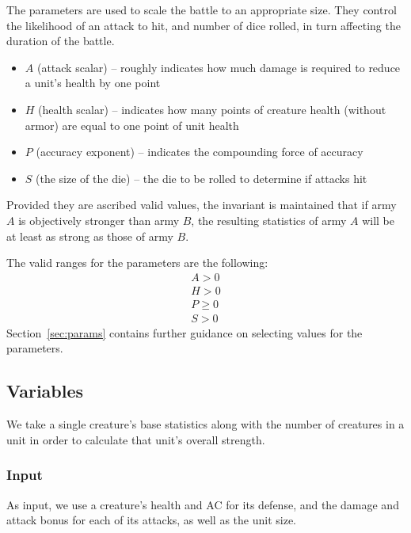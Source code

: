 \documentclass[twocolumn]{article}
\begin{document}
The parameters are used to scale the battle to an appropriate size.
They control the likelihood of an attack to hit,
and number of dice rolled,
in turn affecting the duration of the battle.

\begin{itemize}
    \item $A$ (attack scalar) -- roughly indicates how much damage is required to reduce a unit's health by one point
    \item $H$ (health scalar) -- indicates how many points of creature health (without armor) are equal to one point of unit health
    \item $P$ (accuracy exponent) -- indicates the compounding force of accuracy
    \item $S$ (the size of the die) -- the die to be rolled to determine if attacks hit
\end{itemize}

Provided they are ascribed valid values,
the invariant is maintained that if army $A$ is objectively stronger than army $B$,
the resulting statistics of army $A$ will be at least as strong as those of army $B$.

The valid ranges for the parameters are the following:
\begin{align*}
    A > 0 \\
    H > 0 \\
    P \geq 0 \\
    S > 0
\end{align*}
Section~\ref{sec:params} contains further guidance on selecting values for the parameters.

\subsection{Variables}

We take a single creature's base statistics along with the number of creatures in a unit
in order to calculate that unit's overall strength.

\subsubsection{Input}

As input, we use a creature's health and AC for its defense,
and the damage and attack bonus for each of its attacks,
as well as the unit size.
\end{document}
